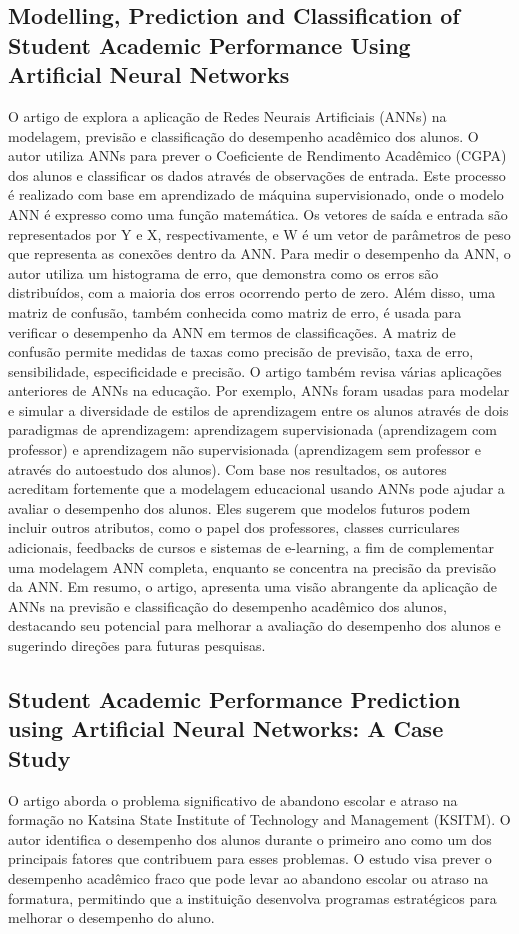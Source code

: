 \documentclass[conference]{IEEEtran}
\begin{document}
\subsection{Modelling, Prediction and Classification of Student Academic Performance Using Artificial Neural Networks\cite{b7}}
O artigo de explora a aplicação de Redes Neurais Artificiais (ANNs) na modelagem, previsão e classificação do desempenho acadêmico dos alunos. O autor utiliza ANNs para prever o Coeficiente de Rendimento Acadêmico (CGPA) dos alunos e classificar os dados através de observações de entrada. Este processo é realizado com base em aprendizado de máquina supervisionado, onde o modelo ANN é expresso como uma função matemática. Os vetores de saída e entrada são representados por Y e X, respectivamente, e W é um vetor de parâmetros de peso que representa as conexões dentro da ANN.
Para medir o desempenho da ANN, o autor utiliza um histograma de erro, que demonstra como os erros são distribuídos, com a maioria dos erros ocorrendo perto de zero. Além disso, uma matriz de confusão, também conhecida como matriz de erro, é usada para verificar o desempenho da ANN em termos de classificações. A matriz de confusão permite medidas de taxas como precisão de previsão, taxa de erro, sensibilidade, especificidade e precisão.
O artigo também revisa várias aplicações anteriores de ANNs na educação. Por exemplo, ANNs foram usadas para modelar e simular a diversidade de estilos de aprendizagem entre os alunos através de dois paradigmas de aprendizagem: aprendizagem supervisionada (aprendizagem com professor) e aprendizagem não supervisionada (aprendizagem sem professor e através do autoestudo dos alunos).
Com base nos resultados, os autores acreditam fortemente que a modelagem educacional usando ANNs pode ajudar a avaliar o desempenho dos alunos. Eles sugerem que modelos futuros podem incluir outros atributos, como o papel dos professores, classes curriculares adicionais, feedbacks de cursos e sistemas de e-learning, a fim de complementar uma modelagem ANN completa, enquanto se concentra na precisão da previsão da ANN.
Em resumo, o artigo, apresenta uma visão abrangente da aplicação de ANNs na previsão e classificação do desempenho acadêmico dos alunos, destacando seu potencial para melhorar a avaliação do desempenho dos alunos e sugerindo direções para futuras pesquisas.

\subsection{Student Academic Performance Prediction using
Artificial Neural Networks: A Case Study\cite{b8}}
O artigo aborda o problema significativo de abandono escolar e atraso na formação no Katsina State Institute of Technology and Management (KSITM). O autor identifica o desempenho dos alunos durante o primeiro ano como um dos principais fatores que contribuem para esses problemas. O estudo visa prever o desempenho acadêmico fraco que pode levar ao abandono escolar ou atraso na formatura, permitindo que a instituição desenvolva programas estratégicos para melhorar o desempenho do aluno.
\end{document}
